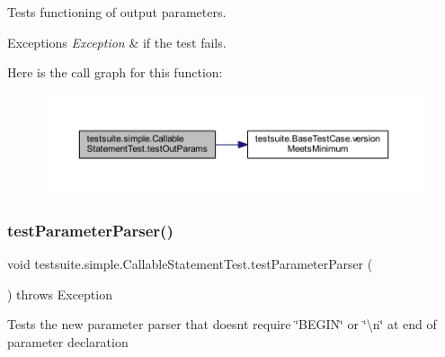 Tests functioning of output parameters.


\begin{DoxyExceptions}{Exceptions}
{\em Exception} & if the test fails. \\
\hline
\end{DoxyExceptions}
Here is the call graph for this function\+:
\nopagebreak
\begin{figure}[H]
\begin{center}
\leavevmode
\includegraphics[width=350pt]{classtestsuite_1_1simple_1_1_callable_statement_test_a1b410c096cba5e99995e4e3fb465a1b7_cgraph}
\end{center}
\end{figure}
\mbox{\label{classtestsuite_1_1simple_1_1_callable_statement_test_a0586bd82e4c828405b924bb8262f464c}} 
\subsubsection{\texorpdfstring{test\+Parameter\+Parser()}{testParameterParser()}}
{\footnotesize\ttfamily void testsuite.\+simple.\+Callable\+Statement\+Test.\+test\+Parameter\+Parser (\begin{DoxyParamCaption}{ }\end{DoxyParamCaption}) throws Exception}

Tests the new parameter parser that doesn\textquotesingle{}t require \char`\"{}\+B\+E\+G\+I\+N\char`\"{} or \char`\"{}\textbackslash{}n\char`\"{} at end of parameter declaration


